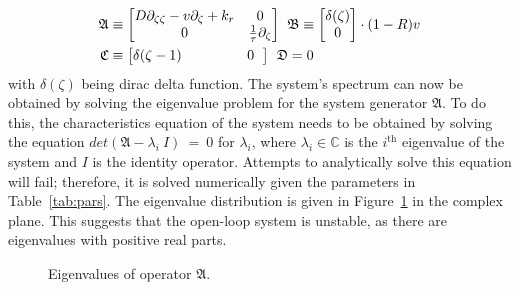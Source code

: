 \begin{equation} \label{eq:operator_A}
    \begin{aligned}
        \mathfrak{A} &\equiv
        \begin{bmatrix}
            D \partial_{\zeta \zeta} - v \partial_\zeta + k_r & 0 \\
            0 & \frac{1}{\tau} \partial_\zeta
        \end{bmatrix} \hspace{0.4em}
        \mathfrak{B} \equiv
        \begin{bmatrix}
            \delta(\zeta) \\
            0
        \end{bmatrix} \cdot (1-R) v \\
        \mathfrak{C} &\equiv
        \begin{bmatrix}
            \delta(\zeta-1) &
            \hspace{3.7em} 0 \hspace{0.6em}
        \end{bmatrix} \hspace{0.42em}
        \mathfrak{D} = 0
    \end{aligned}
\end{equation}
with $\delta(\zeta)$ being dirac delta function. The system's spectrum can now be obtained by solving the eigenvalue problem for the system generator $\mathfrak{A}$. To do this, the characteristics equation of the system needs to be obtained by solving the equation $det(\mathfrak{A}-\lambda_i~I)~=~0$ for $\lambda_i$, where $\lambda_i \in \mathbb{C}$ is the $i^{\text{th}}$ eigenvalue of the system and $I$ is the identity operator. Attempts to analytically solve this equation will fail; therefore, it is solved numerically given the parameters in Table~\ref{tab:pars}. The eigenvalue distribution is given in Figure~\ref{fig:eigval_dist} in the complex plane. This suggests that the open-loop system is unstable, as there are eigenvalues with positive real parts.

\begin{figure}[!htbp]
    \centering
    
    \caption{Eigenvalues of operator $\mathfrak{A}$.}
    \label{fig:eigval_dist}
\end{figure}

